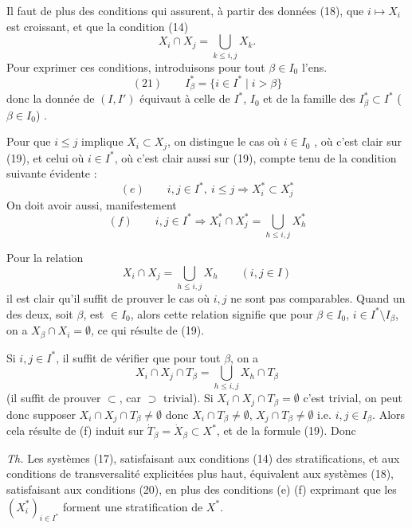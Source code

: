 \documentclass[11pt,a4paper]{article}
\begin{document}

Il faut de plus des conditions qui assurent, à partir des données (18), que $i\mapsto X_i$ est croissant, et que la condition (14)
\[
X_i\cap X_j=\bigcup_{k\le i,j}X_k .
\]
Pour  exprimer ces conditions, introduisons pour tout $\beta\in I_0$ l'ens.
\[
(21)\qquad I^{*}_\beta=\lbrace i\in I^{*}\mid i>\beta\rbrace
\]
donc la donnée de $(I,I')$  équivaut à celle de $I^{*}$, $I_0$  et de la famille des $I^{*}_\beta\subset I^{*}$ ($\beta\in I_0$) .

Pour   que $i\le j$ implique $X_i\subset X_j$, on distingue le cas où $i\in I_0$ \add{($=\beta$)}, \struck{\ill{}} où c'est clair sur (19), et celui où $i\in I^{*}$,  où c'est clair aussi sur (19), compte tenu de la condition suivante évidente :
\[
(e)\qquad i,j\in I^{*},\ i\le j\Longrightarrow X^{*}_i\subset X^{*}_j
\]
 On doit avoir aussi, manifestement
\[
(f)\qquad i,j\in I^{*}\Longrightarrow X^{*}_i\cap X^{*}_j=\bigcup_{h\le i,j}X^{*}_h
\]

Pour la relation
\[
X_i\cap X_j=\bigcup_{h\le i,j}X_h\qquad(i,j\in I)
\]
il est clair qu'il suffit de prouver le cas où $i,j$ ne sont pas comparables. Quand un des deux, soit $\beta$, est $\in I_0$, alors cette relation  signifie que pour $\beta\in I_0$, $i\in I^{*}\setminus I_\beta$, on a $X_\beta\cap X_i=\emptyset$, ce qui résulte de (19).


Si $i,j\in I^{*}$, il suffit  de vérifier que pour tout $\beta$, on a
\[
X_i\cap X_j\cap T_\beta=\bigcup_{h\le i,j}X_h\cap T_\beta
\]
(il suffit de prouver $\subset$, car $\supset$ trivial). Si $X_i\cap X_j\cap T_\beta=\emptyset$ c'est trivial, on peut donc supposer $X_i\cap X_j\cap T_\beta\neq\emptyset$  donc $X_i\cap T_\beta\neq\emptyset$, $X_j\cap T_\beta\neq\emptyset$ i.e. $i,j\in I_\beta$. Alors  cela résulte de (f) induit sur $\dot T_\beta=\dot X_\beta\subset X^{*}$, et de la formule (19). Donc

\emph{Th.} Les systèmes (17), satisfaisant aux conditions  (14) des stratifications, et aux conditions de transversalité explicitées plus haut, équivalent aux systèmes (18), satisfaisant aux conditions (20), en plus des conditions (e) (f) exprimant que les $(X^{*}_i)_{i\in I^{*}}$ forment une stratification de $X^{*}$.
\end{document}
